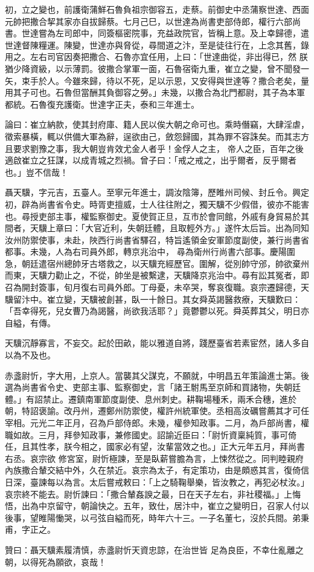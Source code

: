 \begin{pinyinscope}
 初，立之變也，前護衛蒲鮮石魯負祖宗御容五，走蔡。前御史中丞蒲察世達、西面元帥把撒合挈其家亦自拔歸蔡。七月己巳，以世達為尚書吏部侍郎，權行六部尚書。世達嘗為左司郎中，同簽樞密院事，充益政院官，皆稱上意。及上幸歸德，遣世達督陳糧運。陳變，世達亦與脅從，尋間道之汴，至是徒往行在，上念其舊，錄用之。左右司官因奏把撒合、石魯亦宜任用，上曰：「世達曲從，非出得已，然
 朕猶少降資級，以示薄罰。彼撒合掌軍一面，石魯宿衛九重，崔立之變，曾不聞發一矢，束手於人。今雖來歸，待以不死，足以示恩，又安得與世達等？撒合老矣，量用其子可也。石魯但當酬其負御容之勞。」未幾，以撒合為北門都尉，其子為本軍都統。石魯復充護衛。世達字正夫，泰和三年進士。



 論曰：崔立納款，使其封府庫、籍人民以俟大朝之命可也。乘時僭竊，大肆淫虐，徵索暴橫，輒以供備大軍為辭，逞欲由己，斂怨歸國，其為罪不容誅矣。而其志方且要求劉豫之事，我大朝豈肯效尤金人者乎！金俘人之主，
 帝人之臣，百年之後適啟崔立之狂謀，以成青城之烈禍。曾子曰：「戒之戒之，出乎爾者，反乎爾者也。」豈不信哉！



 聶天驥，字元吉，五臺人。至寧元年進士，調汝陰簿，歷睢州司候、封丘令。興定初，辟為尚書省令史。時胥吏擅威，士人往往附之，獨天驥不少假借，彼亦不能害也。尋授吏部主事，權監察御史。夏使賀正旦，互市於會同館，外戚有身貿易於其間者，天驥上章曰：「大官近利，失朝廷體，且取輕外方。」遂忤太后旨。出為同知汝州防禦使事，未赴，陜西行尚書省驛召，特旨遙領金安軍節度副使，兼行尚書省都事。未幾，人為右司員外郎，轉京兆治中，
 尋為衛州行尚書六部事。慶陽圍急，朝廷遣宿州總帥牙古塔救之，以天驥充經歷官。圍解，從別帥守邠，帥欲棄州而東，天驥力勸止之，不從，帥坐是被繫逮，天驥降京兆治中。尋有訟其冤者，即召為開封簽事，旬月復右司員外郎。丁母憂，未卒哭，奪哀復職。哀宗遷歸德，天驥留汴中。崔立變，天驥被創甚，臥一十餘日。其女舜英謁醫救療，天驥歎曰：「吾幸得死，兒女曹乃為謁醫，尚欲我活耶？」竟鬱鬱以死。舜英葬其父，明日亦自縊，有傳。



 天驥沉靜寡言，不妄交。起於田畝，能以雅道自將，踐歷臺省若素宦然，諸人多自以為不及也。



 赤盞尉忻，字大用，上京人。當襲其父謀克，不願就，中明昌五年策論進士第。後選為尚書省令史、吏部主事、監察御史，言「諸王駙馬至京師和買諸物，失朝廷體。」有詔禁止。遷鎮南軍節度副使、息州刺史。耕鞠場種禾，兩禾合穗，進於朝，特詔褒諭。改丹州，遷鄭州防禦使，權許州統軍使。丞相高汝礪嘗薦其才可任宰相。元光二年正月，召為戶部侍郎。未幾，權參知政事。二月，為戶部尚書，權職如故。三月，拜參知政事，兼修國史。詔諭近臣曰：「尉忻資稟純質，事可倚任，且其性孝，朕今相之，國家必有望，汝輩當效之也。」正大元年五月，拜尚書右丞。哀宗欲
 修宮室，尉忻極諫，至是臥薪嘗膽為言，上悚然從之。同判睦親府內族撒合輦交結中外，久在禁近。哀宗為太子，有定策功，由是頗惑其言，復倚信日深，臺諫每以為言。太后嘗戒敕曰：「上之騎鞠舉樂，皆汝教之，再犯必杖汝。」哀宗終不能去。尉忻諫曰：「撒合輦姦諛之最，日在天子左右，非社稷福。」上悔悟，出為中京留守，朝論快之。五年，致仕，居汴中，崔立之變明日，召家人付以後事，望睢陽慟哭，以弓弦自縊而死，時年六十三。一子名董七，沒於兵間。弟秉甫，字正之。



 贊曰：聶天驥素履清慎，赤盞尉忻天資忠諒，在治世皆
 足為良臣，不幸仕亂離之朝，以得死為願欲，哀哉！



\end{pinyinscope}